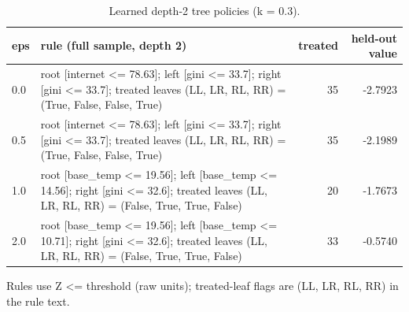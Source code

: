 \begin{table}[htbp]
\centering
\caption{Learned depth-2 tree policies (k = 0.3).}
\label{tab:trees}
\begin{tabular}{lp{8cm}rr}
\toprule
eps & rule (full sample, depth 2) & treated & held-out value \\
\midrule
0.0 & root [internet <= 78.63]; left [gini <= 33.7]; right [gini <= 33.7]; treated leaves (LL, LR, RL, RR) = (True, False, False, True) & 35 & -2.7923 \\
0.5 & root [internet <= 78.63]; left [gini <= 33.7]; right [gini <= 33.7]; treated leaves (LL, LR, RL, RR) = (True, False, False, True) & 35 & -2.1989 \\
1.0 & root [base\_temp <= 19.56]; left [base\_temp <= 14.56]; right [gini <= 32.6]; treated leaves (LL, LR, RL, RR) = (False, True, True, False) & 20 & -1.7673 \\
2.0 & root [base\_temp <= 19.56]; left [base\_temp <= 10.71]; right [gini <= 32.6]; treated leaves (LL, LR, RL, RR) = (False, True, True, False) & 33 & -0.5740 \\
\bottomrule
\end{tabular}
\par\smallskip\footnotesize Rules use Z <= threshold (raw units); treated-leaf flags are (LL, LR, RL, RR) in the rule text.
\end{table}
